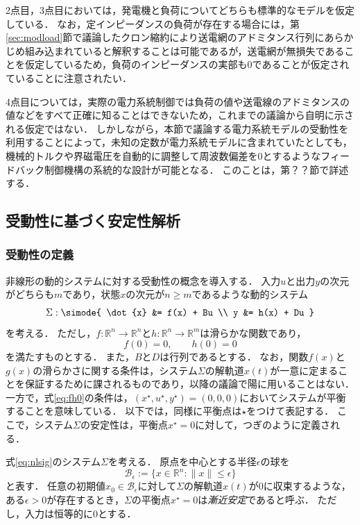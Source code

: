 \documentclass[a4j,10pt,oneside,openany,dvipdfmx]{jsbook}
\begin{document}
2点目，3点目においては，発電機と負荷についてどちらも標準的なモデルを仮定している．
なお，定インピーダンスの負荷が存在する場合には，第\ref{sec:modload}節で議論したクロン縮約により送電網のアドミタンス行列にあらかじめ組み込まれていると解釈することは可能であるが，送電網が無損失であることを仮定しているため，負荷のインピーダンスの実部も0であることが仮定されていることに注意されたい．

4点目については，実際の電力系統制御では負荷の値や送電線のアドミタンスの値などをすべて正確に知ることはできないため，これまでの議論から自明に示される仮定ではない．
しかしながら，本節で議論する電力系統モデルの受動性を利用することによって，未知の定数が電力系統モデルに含まれていたとしても，機械的トルクや界磁電圧を自動的に調整して周波数偏差を0とするようなフィードバック制御機構の系統的な設計が可能となる．
このことは，第？？節で詳述する．

\subsection{受動性に基づく安定性解析}

\subsubsection{受動性の定義}

非線形の動的システムに対する受動性の概念を導入する．
入力$u$と出力$y$の次元がどちらも$m$であり，状態$x$の次元が$n\geq m$であるような動的システム
\begin{equation}\label{eq:nlsig}
\Sigma: \simode{
\dot{x} &= f(x) + Bu \\
y &= h(x) + Du
}
\end{equation}
を考える．
ただし，$f:\mathbb{R}^{n} \rightarrow \mathbb{R}^{n}$と$h:\mathbb{R}^{n} \rightarrow \mathbb{R}^{m}$は滑らかな関数であり，
\begin{equation}\label{eq:fh0}
f(0)=0,\qquad
h(0)=0
\end{equation}
を満たすものとする．
また，$B$と$D$は行列であるとする．
なお，関数$f(x)$と$g(x)$の滑らかさに関する条件は，システム$\Sigma$の解軌道$x(t)$が一意に定まることを保証するために課されるものであり，以降の議論で陽に用いることはない．
一方で，式\eqref{eq:fh0}の条件は，$(x^{\star},u^{\star},y^{\star})=(0,0,0)$においてシステムが平衡することを意味している．
以下では，同様に平衡点は$\star$をつけて表記する．
ここで，システム$\Sigma$の安定性は，平衡点$x^{\star}=0$に対して，つぎのように定義される．

\begin{definition}\label{def:stabnl}
式\eqref{eq:nlsig}のシステム$\Sigma$を考える．
原点を中心とする半径$\epsilon$の球を
\[
\mathcal{B}_{\epsilon} := \{
x \in \mathbb{R}^n : \|x\|\leq \epsilon
\}
\]
と表す．
任意の初期値$x_0 \in \mathcal{B}_{\epsilon}$に対して$\Sigma$の解軌道$x(t)$が0に収束するような，ある$\epsilon>0$が存在するとき，$\Sigma$の平衡点$x^{\star}=0$は\emph{漸近安定}であると呼ぶ．
ただし，入力は恒等的に0とする．
\end{definition}
\end{document}
